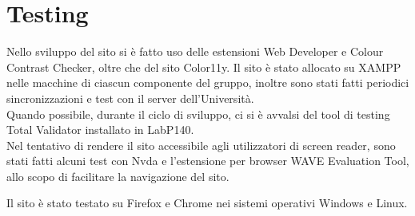 \documentclass[a4paper, 11pt]{article}
\begin{document}
\section{Testing}
Nello sviluppo del sito si è fatto uso delle estensioni Web Developer e Colour Contrast Checker, oltre che del sito Color11y. Il sito è stato allocato su XAMPP nelle macchine di ciascun componente del gruppo, inoltre sono stati fatti periodici sincronizzazioni e test con il server dell’Università. \\
Quando possibile, durante il ciclo di sviluppo, ci si è avvalsi del tool di testing Total Validator installato in LabP140. \\
Nel tentativo di rendere il sito accessibile agli utilizzatori di screen reader, sono stati fatti alcuni test con Nvda e l'estensione per browser WAVE Evaluation Tool, allo scopo di facilitare la navigazione del sito.

Il sito è stato testato su Firefox e Chrome nei sistemi operativi Windows e Linux.
\end{document}
